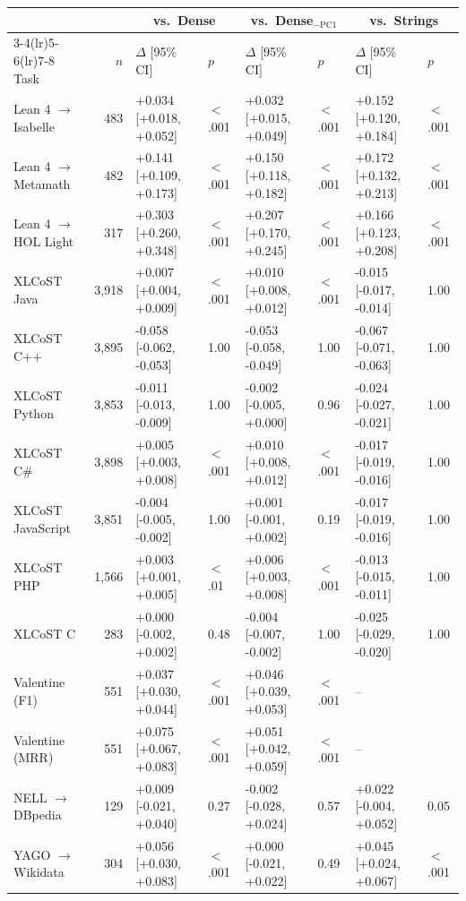 \begin{tabular}{@{}lrllllll@{}}
\toprule
 & & \multicolumn{2}{c}{vs.\ Dense} & \multicolumn{2}{c}{vs.\ Dense$_{-\mathrm{PC1}}$} & \multicolumn{2}{c}{vs.\ Strings} \\
\cmidrule(lr){3-4}\cmidrule(lr){5-6}\cmidrule(lr){7-8}
Task & $n$ & $\Delta$ [95\% CI] & $p$ & $\Delta$ [95\% CI] & $p$ & $\Delta$ [95\% CI] & $p$ \\
\midrule
Lean 4 $\to$ Isabelle & 483 & +0.034 [+0.018, +0.052] & $<$.001 & +0.032 [+0.015, +0.049] & $<$.001 & +0.152 [+0.120, +0.184] & $<$.001 \\
Lean 4 $\to$ Metamath & 482 & +0.141 [+0.109, +0.173] & $<$.001 & +0.150 [+0.118, +0.182] & $<$.001 & +0.172 [+0.132, +0.213] & $<$.001 \\
Lean 4 $\to$ HOL Light & 317 & +0.303 [+0.260, +0.348] & $<$.001 & +0.207 [+0.170, +0.245] & $<$.001 & +0.166 [+0.123, +0.208] & $<$.001 \\
XLCoST Java & 3,918 & +0.007 [+0.004, +0.009] & $<$.001 & +0.010 [+0.008, +0.012] & $<$.001 & -0.015 [-0.017, -0.014] & 1.00 \\
XLCoST C++ & 3,895 & -0.058 [-0.062, -0.053] & 1.00 & -0.053 [-0.058, -0.049] & 1.00 & -0.067 [-0.071, -0.063] & 1.00 \\
XLCoST Python & 3,853 & -0.011 [-0.013, -0.009] & 1.00 & -0.002 [-0.005, +0.000] & 0.96 & -0.024 [-0.027, -0.021] & 1.00 \\
XLCoST C\# & 3,898 & +0.005 [+0.003, +0.008] & $<$.001 & +0.010 [+0.008, +0.012] & $<$.001 & -0.017 [-0.019, -0.016] & 1.00 \\
XLCoST JavaScript & 3,851 & -0.004 [-0.005, -0.002] & 1.00 & +0.001 [-0.001, +0.002] & 0.19 & -0.017 [-0.019, -0.016] & 1.00 \\
XLCoST PHP & 1,566 & +0.003 [+0.001, +0.005] & $<$.01 & +0.006 [+0.003, +0.008] & $<$.001 & -0.013 [-0.015, -0.011] & 1.00 \\
XLCoST C & 283 & +0.000 [-0.002, +0.002] & 0.48 & -0.004 [-0.007, -0.002] & 1.00 & -0.025 [-0.029, -0.020] & 1.00 \\
Valentine (F1) & 551 & +0.037 [+0.030, +0.044] & $<$.001 & +0.046 [+0.039, +0.053] & $<$.001 & -- \\
Valentine (MRR) & 551 & +0.075 [+0.067, +0.083] & $<$.001 & +0.051 [+0.042, +0.059] & $<$.001 & -- \\
NELL $\to$ DBpedia & 129 & +0.009 [-0.021, +0.040] & 0.27 & -0.002 [-0.028, +0.024] & 0.57 & +0.022 [-0.004, +0.052] & 0.05 \\
YAGO $\to$ Wikidata & 304 & +0.056 [+0.030, +0.083] & $<$.001 & +0.000 [-0.021, +0.022] & 0.49 & +0.045 [+0.024, +0.067] & $<$.001 \\

\end{tabular}
